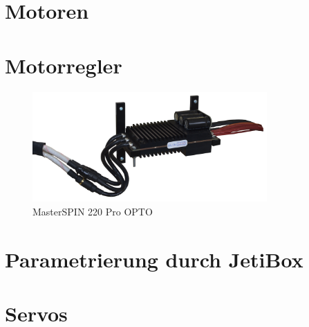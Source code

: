 \section{Motoren}

\newpage
\section{Motorregler}
\begin{figure}[h]
    \includegraphics[width=0.8\textwidth]{Fotos/MasterSpin.png}
    \caption{MasterSPIN 220 Pro OPTO}
\end{figure}
\section{Parametrierung durch JetiBox}
\newpage


\section{Servos}